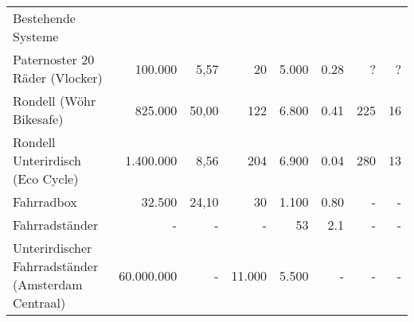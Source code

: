 \begin{landscape}
\begin{longtable}{p{}rrrrrrr}
    Bestehende Systeme                                                                                                                                                                                                                                                                                                      \\
    Paternoster 20 Räder (Vlocker)                     & 100.000                                   & 5,57\cite{vlocker_fläche,parkplatz_größe} & 20\cite{vlocker_kapazität}          & 5.000\cite{vlocker_preis} & 0.28                           & ?                                    & ?                                \\
    Rondell (Wöhr Bikesafe)                            & 825.000\cite{richtpreisangebot}           & 50,00\cite{wöhr_fläche}                   & 122\cite{richtpreisangebot}         & 6.800                     & 0.41                           & 225                                  & 16\cite{wöhr_time}               \\
    Rondell Unterirdisch (Eco Cycle)                   & 1.400.000\cite{ecocycle_cost}             & 8,56\cite{ecocycle_giken}                 & 204\cite{ecocycle_giken}            & 6.900                     & 0.04                           & 280                                  & 13\cite{ecocycle_specifications} \\
    Fahrradbox                                         & 32.500\cite{box_angebot_orion}            & 24,10\cite{box_angebot_orion}             & 30\cite{box_angebot_orion}          & 1.100                     & 0.80                           & -                                    & -                                \\
    Fahrradständer                                     & -                                         & -                                         & -                                   & 53\cite{ständer_preis}    & 2.1\cite{leitfaden_vorarlberg} & -                                    & -                                \\
    Unterirdischer Fahrradständer (Amsterdam Centraal) & 60.000.000\cite{ständer_unter}            & -                                         & 11.000\cite{ständer_unter}          & 5.500                     & -                              & -                                    & -                                \\


\end{longtable}
\end{landscape}
